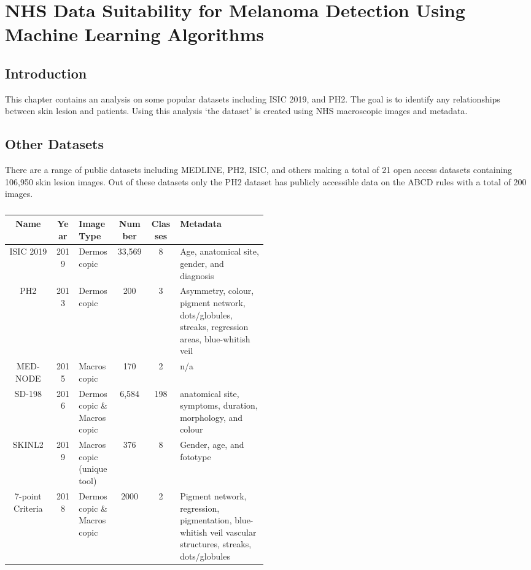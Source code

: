 \chapter{NHS Data Suitability for Melanoma Detection Using Machine Learning Algorithms}

\section{Introduction}
This chapter contains an analysis on some popular datasets including ISIC 2019, and PH2. The goal is to identify any relationships between skin lesion and patients. Using this analysis `the dataset' is created using NHS macroscopic images and metadata.

\section{Other Datasets}
There are a range of public datasets including MEDLINE, PH2, ISIC, and others making a total of 21 open access datasets containing 106,950 skin lesion images\cite{Wen2022}. Out of these datasets only the PH2 dataset has publicly accessible data on the ABCD rules with a total of 200 images.

\begin{table}
	\small
	\begin{tabular}{|c|c|p{0.15\linewidth}|c|c|p{0.34\linewidth}|}
		\hline
		Name & Year & Image Type & Number & Classes & Metadata \\
		\hline
		ISIC 2019 & 2019 & Dermoscopic & 33,569 & 8 & Age, anatomical site, gender, and diagnosis
		\\
		\hline
		PH2 & 2013 & Dermoscopic & 200 & 3 & Asymmetry, colour, pigment network, dots/globules, streaks, regression areas, blue-whitish veil
		\\
		\hline
		MED-NODE  & 2015 & Macroscopic & 170 & 2 & n/a
		\\
		\hline	
		SD-198  & 2016 & Dermoscopic \& Macroscopic & 6,584 & 198 & anatomical site, symptoms, duration, morphology, and colour
		\\
		\hline	
		SKINL2 & 2019 & Macroscopic (unique tool) & 376 & 8 & Gender, age, and fototype
		\\
		\hline
		7-point Criteria & 2018 & Dermoscopic \& Macroscopic & 2000 & 2 & Pigment network, regression, pigmentation, blue-whitish veil vascular structures, streaks, dots/globules
		\\
		\hline	
	\end{tabular}
	\caption{}
	\end{table} \label{datasets}

